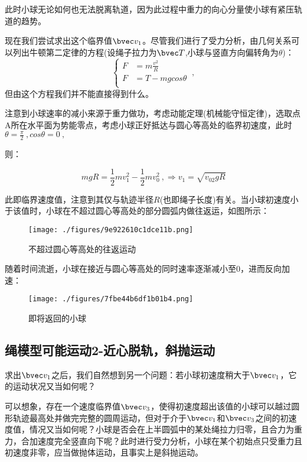 此时小球无论如何也无法脱离轨道，因为此过程中重力的向心分量使小球有紧压轨道的趋势。

现在我们尝试求出这个临界值$\bvec v_1$。尽管我们进行了受力分析，由几何关系可以列出牛顿第二定律的方程(设绳子拉力为$\bvec T$,小球与竖直方向偏转角为$\theta$)：
$$
\left \{
\begin{aligned}
F&=m\frac{v^2}{R}\\
F&=T-mg cos \theta \\
\end{aligned}
\right.
~,
$$
但由这个方程我们并不能直接得到什么。

注意到小球速率的减小来源于重力做功，考虑动能定理(机械能守恒定律)，选取点A所在水平面为势能零点，考虑小球正好抵达与圆心等高处的临界初速度，此时
$\theta=\frac{\pi }{2}~, cos \theta=0~,$

则：

\begin{equation}
mgR = \frac12 mv_1^2 - \frac12 mv_0^2~,
\Rightarrow 
v_1=\sqrt{v_02gR}
\end{equation}

此即临界速度值，注意到其仅与轨迹半径$R$(也即绳子长度)有关。当小球初速度小于该值时，小球在不超过圆心等高处的部分圆弧内做往返运，如图所示：
\begin{figure}[ht]
\centering
\texttt{[image: ./figures/9e922610c1dce11b.png]}
\caption{不超过圆心等高处的往返运动} \label{fig_CirVer_2}
\end{figure}

随着时间流逝，小球在接近与圆心等高处的同时速率逐渐减小至0，进而反向加速：

\begin{figure}[ht]
\centering
\texttt{[image: ./figures/7fbe44b6df1b01b4.png]}
\caption{即将返回的小球} \label{fig_CirVer_1}
\end{figure}

\subsection{绳模型可能运动2-近心脱轨，斜抛运动}
求出$\bvec v_1$之后，我们自然想到另一个问题：若小球初速度稍大于$\bvec v_1$，它的运动状况又当如何呢？

可以想象，存在一个速度临界值$\bvec v_3$，使得初速度超出该值的小球可以越过圆形轨迹最高处并做完完整的圆周运动，但对于介于$\bvec v_1$和$\bvec v_3$之间的初速度值，情况又当如何呢？小球是否会在上半圆弧中的某处绳拉力归零，且合力为重力，合加速度完全竖直向下呢？此时进行受力分析，小球在某个初始点只受重力且初速度非零，应当做抛体运动，且事实上是斜抛运动。

